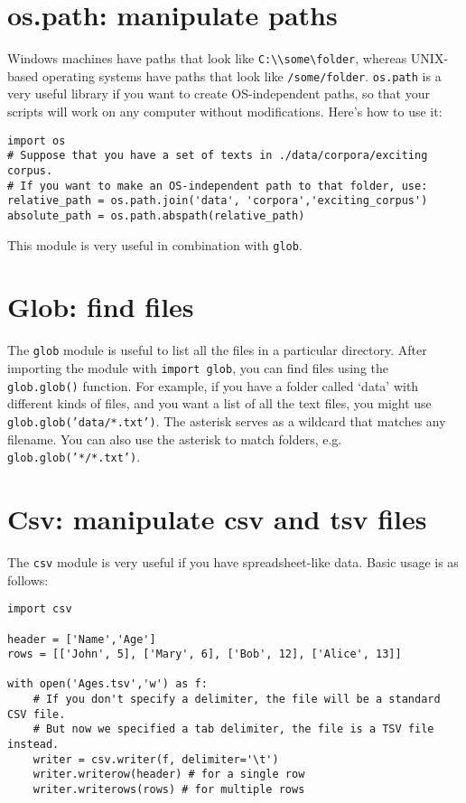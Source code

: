 \documentclass[12pt]{book}
\begin{document}
\section{os.path: manipulate paths}

Windows machines have paths that look like \texttt{C:\textbackslash{}\textbackslash{}some\textbackslash{}folder}, whereas UNIX-based operating systems have paths that look like \texttt{/some/folder}. \texttt{os.path} is a very useful library if you want to create OS-independent paths, so that your scripts will work on any computer without modifications. Here's how to use it:

\begin{lstlisting}
import os
# Suppose that you have a set of texts in ./data/corpora/exciting corpus.
# If you want to make an OS-independent path to that folder, use:
relative_path = os.path.join('data', 'corpora','exciting_corpus')
absolute_path = os.path.abspath(relative_path)
\end{lstlisting}

This module is very useful in combination with \texttt{glob}.

\section{Glob: find files}

The \texttt{glob} module is useful to list all the files in a particular directory. After importing the module with \texttt{import\ glob}, you can find files using the \texttt{glob.glob()} function. For example, if you have a folder called `data' with different kinds of files, and you want a list of all the text files, you might use \texttt{glob.glob('data/*.txt')}. The asterisk serves as a wildcard that matches any filename. You can also use the asterisk to match folders, e.g.
\texttt{glob.glob('*/*.txt')}.


\section{Csv: manipulate csv and tsv files}

The \texttt{csv} module is very useful if you have spreadsheet-like data. Basic usage is as follows:

\begin{lstlisting}
import csv

header = ['Name','Age']
rows = [['John', 5], ['Mary', 6], ['Bob', 12], ['Alice', 13]]

with open('Ages.tsv','w') as f:
    # If you don't specify a delimiter, the file will be a standard CSV file.
    # But now we specified a tab delimiter, the file is a TSV file instead.
    writer = csv.writer(f, delimiter='\t')
    writer.writerow(header) # for a single row
    writer.writerows(rows) # for multiple rows
\end{lstlisting}
\end{document}

